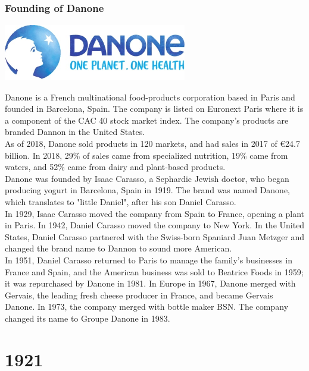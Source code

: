 \documentclass[11pt]{report}
\begin{document}
\section{}
\subsection{Founding of Danone}
\vspace{2mm}\begin{center}\includegraphics[width=8cm]{./img/danoneLogo.jpg}\end{center}
Danone is a French multinational food-products corporation based in Paris and founded in Barcelona, Spain. The company is listed on Euronext Paris where it is a component of the CAC 40 stock market index. The company's products are branded Dannon in the United States.\\
\indent As of 2018, Danone sold products in 120 markets, and had sales in 2017 of €24.7 billion. In 2018, 29\% of sales came from specialized nutrition, 19\% came from waters, and 52\% came from dairy and plant-based products.\\
\indent Danone was founded by Isaac Carasso, a Sephardic Jewish doctor, who began producing yogurt in Barcelona, Spain in 1919. The brand was named Danone, which translates to "little Daniel", after his son Daniel Carasso.\\
\indent In 1929, Isaac Carasso moved the company from Spain to France, opening a plant in Paris. In 1942, Daniel Carasso moved the company to New York. In the United States, Daniel Carasso partnered with the Swiss-born Spaniard Juan Metzger and changed the brand name to Dannon to sound more American.\\ \indent In 1951, Daniel Carasso returned to Paris to manage the family's businesses in France and Spain, and the American business was sold to Beatrice Foods in 1959; it was repurchased by Danone in 1981. In Europe in 1967, Danone merged with Gervais, the leading fresh cheese producer in France, and became Gervais Danone. In 1973, the company merged with bottle maker BSN. The company changed its name to Groupe Danone in 1983.

\chapter{1921}
\end{document}
